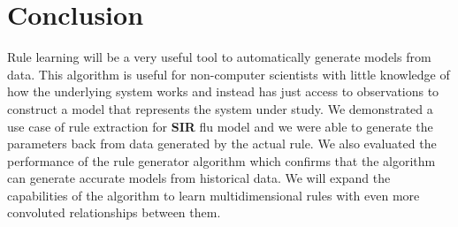 \documentclass[11pt, a4paper]{article} %
\begin{document}

\section{Conclusion}
Rule learning will be a very useful tool to automatically generate models from data. This algorithm is useful for non-computer scientists with little knowledge of how the underlying system works and instead has just access to observations to construct a model that represents the system under study. We demonstrated a use case of rule extraction for \textbf{SIR} flu model and we were able to generate the parameters back from data generated by the actual rule. We also evaluated the performance of the rule generator algorithm which confirms that the algorithm can generate accurate models from historical data.
We will expand the capabilities of the algorithm to learn multidimensional rules with even more convoluted relationships between them.



\newpage %

%


\end{document}
